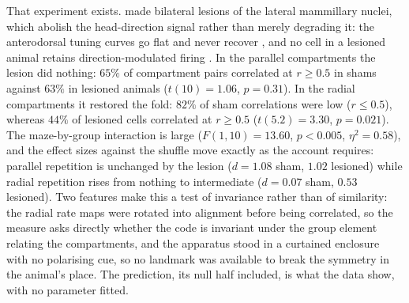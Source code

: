 That experiment exists. \citet{harland2017} made bilateral lesions of the lateral mammillary nuclei,
which abolish the head-direction signal rather than merely degrading it: the anterodorsal tuning curves
go flat and never recover \citep{blair1999}, and no cell in a lesioned animal retains
direction-modulated firing \citep{bassett2007}. In the parallel compartments the lesion did nothing:
$65\%$ of compartment pairs correlated at $r \ge 0.5$ in shams against $63\%$ in lesioned animals
($t(10) = 1.06$, $p = 0.31$). In the radial compartments it restored the fold: $82\%$ of sham
correlations were low ($r \le 0.5$), whereas $44\%$ of lesioned cells correlated at $r \ge 0.5$
($t(5.2) = 3.30$, $p = 0.021$). The maze-by-group interaction is large ($F(1,10) = 13.60$, $p < 0.005$,
$\eta^2 = 0.58$), and the effect sizes against the shuffle move exactly as the account requires:
parallel repetition is unchanged by the lesion ($d = 1.08$ sham, $1.02$ lesioned) while radial
repetition rises from nothing to intermediate ($d = 0.07$ sham, $0.53$ lesioned). Two features make this
a test of invariance rather than of similarity: the radial rate maps were rotated into alignment before
being correlated, so the measure asks directly whether the code is invariant under the group element
relating the compartments, and the apparatus stood in a curtained enclosure with no polarising cue, so
no landmark was available to break the symmetry in the animal's place. The prediction, its null half
included, is what the data show, with no parameter fitted.

